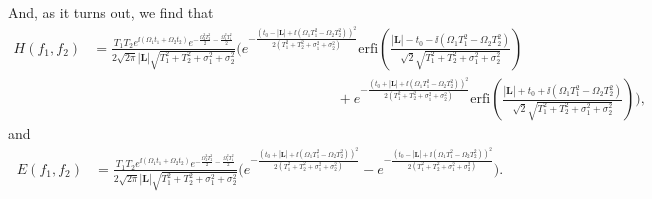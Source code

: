 And, as it turns out, we find that{\footnotesize
\begin{align}
    H(f_1,f_2) &= \frac{T_1T_2e^{\ii (\Omega_1 t_1+\Omega_2 t_2)}e^{- \frac{\Omega_2^2 T_2^2}{2} - \frac{\Omega_1^2 T_1^2}{2}}}{2\sqrt{2\pi}|\bm L|\sqrt{T_1^2 + T_2^2 + \sigma_1^2 + \sigma_2^2}} \Bigg(e^{- \frac{(t_0 - |\bm L|+\ii (\Omega_1 T_1^2- \Omega_2 T_2^2))^2}{2(T_1^2 + T_2^2 + \sigma_1^2 + \sigma_2^2)}}\text{erfi}\left(\frac{|\bm L|-t_0-\ii (\Omega_1 T_1^2- \Omega_2 T_2^2)}{\sqrt{2}\sqrt{T_1^2 + T_2^2 + \sigma_1^2 + \sigma_2^2}}\right)\\
     &\:\:\:\:\:\:\:\:\:\:\:\:\:\:\:\:\:\:\:\:\:\:\:\:\:\:\:\:\:\:\:\:\:\:\:\:\:\:\:\:\:\:\:\:\:\:\:\:\:\:\:\:\:\:\:\:\:\:\:\:\:\:\:\:\:\:\:\:\:\:\:\:\:\:\:\:\:\:\:+e^{- \frac{(t_0 + |\bm L|+\ii (\Omega_1 T_1^2- \Omega_2 T_2^2))^2}{2(T_1^2 + T_2^2 + \sigma_1^2 + \sigma_2^2)}}\text{erfi}\left(\frac{|\bm L|+t_0+\ii (\Omega_1 T_1^2- \Omega_2 T_2^2)}{\sqrt{2}\sqrt{T_1^2 + T_2^2 + \sigma_1^2 + \sigma_2^2}}\right)\Bigg),\label{eq:Hbig}\nonumber
\end{align}}
and
\begin{align}
    E(f_1,f_2) &= \frac{T_1T_2e^{\ii (\Omega_1 t_1+\Omega_2 t_2)}e^{- \frac{\Omega_2^2 T_2^2}{2} - \frac{\Omega_1^2 T_1^2}{2}}}{2\sqrt{2\pi}|\bm L|\sqrt{T_1^2 + T_2^2 + \sigma_1^2 + \sigma_2^2}} \Bigg(e^{- \frac{(t_0 + |\bm L|+\ii (\Omega_1 T_1^2- \Omega_2 T_2^2))^2}{2(T_1^2 + T_2^2 + \sigma_1^2 + \sigma_2^2)}}-e^{- \frac{(t_0 - |\bm L|+\ii (\Omega_1 T_1^2- \Omega_2 T_2^2))^2}{2(T_1^2 + T_2^2 + \sigma_1^2 + \sigma_2^2)}}\Bigg).
\end{align}

